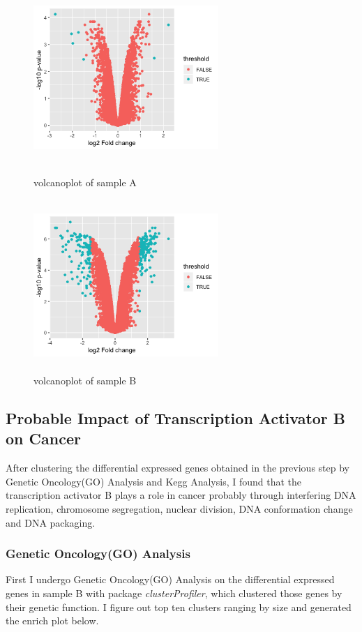 \documentclass[fleqn,10pt]{wlscirep}
\begin{document}
\begin{figure}[h]
    \begin{minipage}[t]{0.45\linewidth}
    \centering
    \includegraphics[width=7cm,height=6.5cm]{sA.png}
    \caption{volcanoplot of sample A}
    \end{minipage}
    \begin{minipage}[t]{0.45\linewidth}        %
    \hspace{2mm}
    \includegraphics[width=7cm,height=6.5cm]{sB.png}
    \caption{volcanoplot of sample B}
    \end{minipage}
\end{figure}

\subsection*{Probable Impact of Transcription Activator B on Cancer}
After clustering the differential expressed genes obtained in the previous step by Genetic Oncology(GO) Analysis and Kegg Analysis, I found that the transcription activator B plays a role in cancer probably through interfering DNA replication, chromosome segregation, nuclear division, DNA conformation change and DNA packaging.

\subsubsection{Genetic Oncology(GO) Analysis}
First I undergo Genetic Oncology(GO) Analysis on the differential expressed genes in sample B with package \textit{clusterProfiler}\cite{yu2012clusterprofiler}, which clustered those genes by their genetic function.  I figure out top ten clusters ranging by size and generated the enrich plot below.
\end{document}
